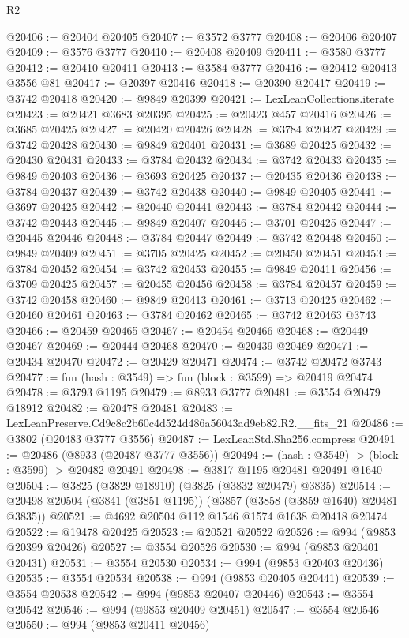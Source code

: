 \begin{lexlean}{R2}
\begin{coremodule}
@20406 := @20404 @20405
@20407 := @3572 @3777
@20408 := @20406 @20407
@20409 := @3576 @3777
@20410 := @20408 @20409
@20411 := @3580 @3777
@20412 := @20410 @20411
@20413 := @3584 @3777
@20416 := @20412 @20413 @3556 @81
@20417 := @20397 @20416
@20418 := @20390 @20417
@20419 := @3742 @20418
@20420 := @9849 @20399
@20421 := LexLeanCollections.iterate
@20423 := @20421 @3683 @20395
@20425 := @20423 @457 @20416
@20426 := @3685 @20425
@20427 := @20420 @20426
@20428 := @3784 @20427
@20429 := @3742 @20428
@20430 := @9849 @20401
@20431 := @3689 @20425
@20432 := @20430 @20431
@20433 := @3784 @20432
@20434 := @3742 @20433
@20435 := @9849 @20403
@20436 := @3693 @20425
@20437 := @20435 @20436
@20438 := @3784 @20437
@20439 := @3742 @20438
@20440 := @9849 @20405
@20441 := @3697 @20425
@20442 := @20440 @20441
@20443 := @3784 @20442
@20444 := @3742 @20443
@20445 := @9849 @20407
@20446 := @3701 @20425
@20447 := @20445 @20446
@20448 := @3784 @20447
@20449 := @3742 @20448
@20450 := @9849 @20409
@20451 := @3705 @20425
@20452 := @20450 @20451
@20453 := @3784 @20452
@20454 := @3742 @20453
@20455 := @9849 @20411
@20456 := @3709 @20425
@20457 := @20455 @20456
@20458 := @3784 @20457
@20459 := @3742 @20458
@20460 := @9849 @20413
@20461 := @3713 @20425
@20462 := @20460 @20461
@20463 := @3784 @20462
@20465 := @3742 @20463 @3743
@20466 := @20459 @20465
@20467 := @20454 @20466
@20468 := @20449 @20467
@20469 := @20444 @20468
@20470 := @20439 @20469
@20471 := @20434 @20470
@20472 := @20429 @20471
@20474 := @3742 @20472 @3743
@20477 := fun (hash : @3549) => fun (block : @3599) => @20419 @20474
@20478 := @3793 @1195
@20479 := @8933 @3777
@20481 := @3554 @20479 @18912
@20482 := @20478 @20481
@20483 := LexLeanPreserve.Cd9c8c2b60c4d524d486a56043ad9eb82.R2.__fits_21
@20486 := @3802 (@20483 @3777 @3556)
@20487 := LexLeanStd.Sha256.compress
@20491 := @20486 (@8933 (@20487 @3777 @3556))
@20494 := (hash : @3549) -> (block : @3599) -> @20482 @20491
@20498 := @3817 @1195 @20481 @20491 @1640
@20504 := @3825 (@3829 @18910) (@3825 (@3832 @20479) @3835)
@20514 := @20498 @20504 (@3841 (@3851 @1195)) (@3857 (@3858 (@3859 @1640) @20481 @3835))
@20521 := @4692 @20504 @112 @1546 @1574 @1638 @20418 @20474
@20522 := @19478 @20425
@20523 := @20521 @20522
@20526 := @994 (@9853 @20399 @20426)
@20527 := @3554 @20526
@20530 := @994 (@9853 @20401 @20431)
@20531 := @3554 @20530
@20534 := @994 (@9853 @20403 @20436)
@20535 := @3554 @20534
@20538 := @994 (@9853 @20405 @20441)
@20539 := @3554 @20538
@20542 := @994 (@9853 @20407 @20446)
@20543 := @3554 @20542
@20546 := @994 (@9853 @20409 @20451)
@20547 := @3554 @20546
@20550 := @994 (@9853 @20411 @20456)

\end{coremodule}
\end{lexlean}
